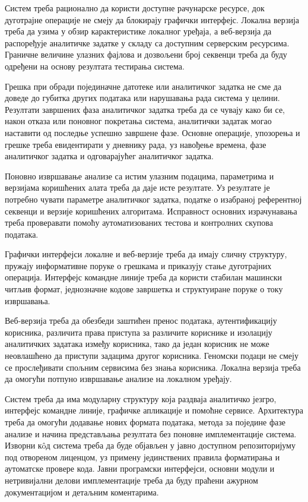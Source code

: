 \documentclass[12pt,oneside]{memoir}
\begin{document}
Систем треба рационално да користи доступне рачунарске ресурсе, док дуготрајне операције не смеју да блокирају графички интерфејс. Локална верзија треба да узима у обзир карактеристике локалног уређаја, а веб-верзија да распоређује аналитичке задатке у складу са доступним серверским ресурсима. Граничне величине улазних фајлова и дозвољени број секвенци треба да буду одређени на основу резултата тестирања система.

Грешка при обради појединачне датотеке или аналитичког задатка не сме да доведе до губитка других података или нарушавања рада система у целини. Резултати завршених фаза аналитичког задатка треба да се чувају како би се, након отказа или поновног покретања система, аналитички задатак могао наставити од последње успешно завршене фазе. Основне операције, упозорења и грешке треба евидентирати у дневнику рада, уз навођење времена, фазе аналитичког задатка и одговарајућег аналитичког задатка.

Поновно извршавање анализе са истим улазним подацима, параметрима и верзијама коришћених алата треба да даје исте резултате. Уз резултате је потребно чувати параметре аналитичког задатка, податке о изабраној референтној секвенци и верзије коришћених алгоритама. Исправност основних израчунавања треба проверавати помоћу аутоматизованих тестова и контролних скупова података.

Графички интерфејси локалне и веб-верзије треба да имају сличну структуру, пружају информативне поруке о грешкама и приказују стање дуготрајних операција. Интерфејс командне линије треба да користи стабилан машински читљив формат, једнозначне кодове завршетка и структуиране поруке о току извршавања.

Веб-верзија треба да обезбеди заштићен пренос података, аутентификацију корисника, различита права приступа за различите кориснике и изолацију аналитичких задатака између корисника, тако да један корисник не може неовлашћено да приступи задацима другог корисника. Геномски подаци не смеју се прослеђивати спољним сервисима без знања корисника. Локална верзија треба да омогући потпуно извршавање анализе на локалном уређају.

Систем треба да има модуларну структуру која раздваја аналитичко језгро, интерфејс командне линије, графичке апликације и помоћне сервисе. Архитектура треба да омогући додавање нових формата података, метода за поједине фазе анализе и начина представљања резултата без поновне имплементације система. Изворни кôд система треба да буде објављен у јавно доступном репозиторијуму под отвореном лиценцом, уз примену јединствених правила форматирања и аутоматске провере кода. Јавни програмски интерфејси, основни модули и нетривијални делови имплементације треба да буду праћени ажурном документацијом и детаљним коментарима.
\end{document}
